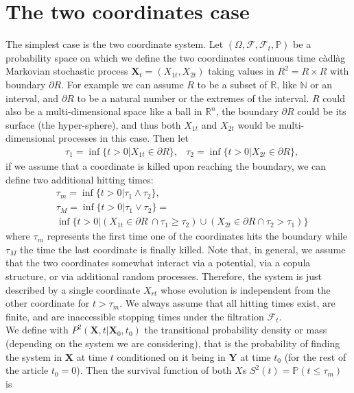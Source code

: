 \documentclass[a4paper,11pt]{amsart}
\theoremstyle{remark}
\begin{document}
\section{The two coordinates case}
The simplest case is the two coordinate system. Let $(\Omega,\mathcal{F}, \mathcal{F}_t, \mathbb{P})$ be a probability space on which we define the two coordinates continuous time c\`adl\`ag Markovian stochastic process $\mathbf{X}_t=(X_{1t},X_{2t})$ taking values in $R^2=R\times R$ with boundary $\partial R$. For example we can assume $R$ to be a subset of $\mathbb{R}$, like $\mathbb{N}$ or an interval, and $\partial R$ to be a natural number or the extremes of the interval. $R$ could also be a multi-dimensional space like a ball in $\mathbb{R}^n$, the boundary $\partial R$ could be its surface (the hyper-sphere), and thus both $X_{1t}$ and $X_{2t}$ would be multi-dimensional processes in this case. Then let
  \begin{align}
    &\tau_1=\inf\{t>0| X_{1t} \in \partial R\}, &\tau_2=\inf\{t>0|X_{2t} \in \partial R\},
  \end{align}
  if we assume that a coordinate is killed upon reaching the boundary, we can define two additional hitting times:
  \begin{align}
    &\tau_m=\inf\{t>0 |\tau_1\wedge \tau_2\}, \\
    &\tau_M=\inf\{t>0 |\tau_1\vee \tau_2\}= \\
    &\inf\{t>0| (X_{1t} \in \partial R\ \cap \tau_1\geq\tau_2) \cup (X_{2t}\in \partial R \cap \tau_2>\tau_1)\}\nonumber
  \end{align}
  where $\tau_m$ represents the first time one of the coordinates hits the boundary while $\tau_M$ the time the last coordinate is finally killed. Note that, in general, we assume that the two coordinates somewhat interact via a potential, via a copula structure, or via additional random processes. Therefore, the system is just described by a single coordinate $X_{rt}$  whose evolution is independent from the other coordinate for $t>\tau_m$. We always assume that all hitting times exist, are finite, and are inaccessible stopping times under the filtration $\mathcal{F}_t$.\\
  We define with $P^2(\mathbf{X},t|\mathbf{X}_0,t_0)$ the transitional probability density or mass (depending on the system we are considering), that is the probability of finding the system in $\mathbf{X}$ at time $t$ conditioned on it being in $\mathbf{Y}$ at time $t_0$ (for the rest of the article $t_0=0$). Then the survival function of both $X$s $S^2(t)=\mathbb{P}(t\leq\tau_m)$ is
\end{document}
